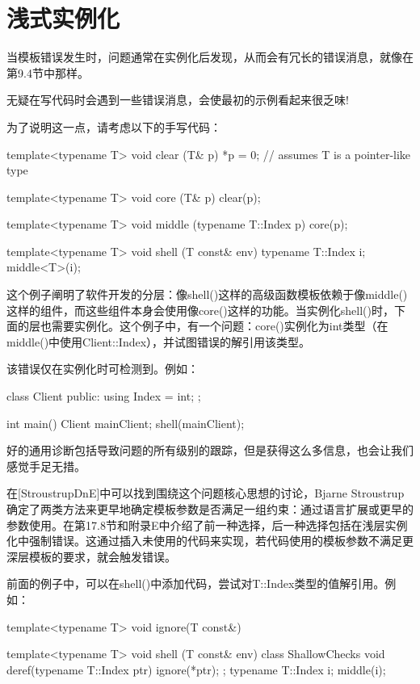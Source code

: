\section{浅式实例化}
当模板错误发生时，问题通常在实例化后发现，从而会有冗长的错误消息，就像在第9.4节中那样。

\begin{notice}
无疑在写代码时会遇到一些错误消息，会使最初的示例看起来很乏味!
\end{notice}

为了说明这一点，请考虑以下的手写代码：

\begin{cpp}
template<typename T>
void clear (T& p) {
	*p = 0; // assumes T is a pointer-like type
}

template<typename T>
void core (T& p) {
	clear(p);
}

template<typename T>
void middle (typename T::Index p) {
	core(p);
}

template<typename T>
void shell (T const& env) {
	typename T::Index i;
	middle<T>(i);
}
\end{cpp}

这个例子阐明了软件开发的分层：像shell()这样的高级函数模板依赖于像middle()这样的组件，而这些组件本身会使用像core()这样的功能。当实例化shell()时，下面的层也需要实例化。这个例子中，有一个问题：core()实例化为int类型（在middle()中使用Client::Index），并试图错误的解引用该类型。

该错误仅在实例化时可检测到。例如：

\begin{cpp}
class Client {
	public:
	using Index = int;
};

int main() {
	Client mainClient;
	shell(mainClient);
}
\end{cpp}

好的通用诊断包括导致问题的所有级别的跟踪，但是获得这么多信息，也会让我们感觉手足无措。

在[StroustrupDnE]中可以找到围绕这个问题核心思想的讨论，Bjarne Stroustrup确定了两类方法来更早地确定模板参数是否满足一组约束：通过语言扩展或更早的参数使用。在第17.8节和附录E中介绍了前一种选择，后一种选择包括在浅层实例化中强制错误。这通过插入未使用的代码来实现，若代码使用的模板参数不满足更深层模板的要求，就会触发错误。

前面的例子中，可以在shell()中添加代码，尝试对T::Index类型的值解引用。例如：

\begin{cpp}
template<typename T>
void ignore(T const&) { }

template<typename T>
void shell (T const& env) {
	class ShallowChecks
	{
		void deref(typename T::Index ptr) {
			ignore(*ptr);
		}
	};
	typename T::Index i;
	middle(i);
}
\end{cpp}

